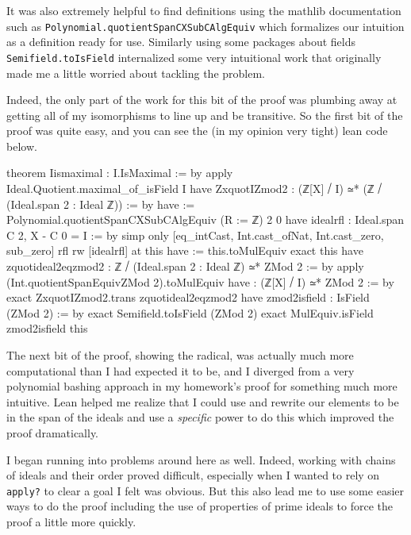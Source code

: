 \documentclass{article}
\begin{document}
\medskip

It was also extremely helpful to find definitions using the mathlib documentation such as \verb|Polynomial.quotientSpanCXSubCAlgEquiv| which formalizes our intuition as a definition ready for use. Similarly using some packages about fields \verb|Semifield.toIsField| internalized some very intuitional work that originally made me a little worried about tackling the problem. 

\medskip

Indeed, the only part of the work for this bit of the proof was plumbing away at getting all of my isomorphisms to line up and be transitive. So the first bit of the proof was quite easy, and you can see the (in my opinion very tight) lean code below. 

\begin{lean}
theorem Iismaximal : I.IsMaximal := by 
  apply Ideal.Quotient.maximal_of_isField I
  have ZxquotIZmod2 : (ℤ[X] ⧸ I) ≃* (ℤ ⧸ (Ideal.span {2} : Ideal ℤ)) := by 
    have := Polynomial.quotientSpanCXSubCAlgEquiv (R := ℤ) 2 0
    have idealrfl : Ideal.span {C 2, X - C 0} = I := by 
      simp only [eq_intCast, Int.cast_ofNat, Int.cast_zero, sub_zero]
      rfl
    rw [idealrfl] at this
    have := this.toMulEquiv 
    exact this
  have zquotideal2eqzmod2 : ℤ ⧸ (Ideal.span {2} : Ideal ℤ) ≃* ZMod 2 := by 
    apply (Int.quotientSpanEquivZMod 2).toMulEquiv 
  have : (ℤ[X] ⧸ I) ≃* ZMod 2 := by 
    exact ZxquotIZmod2.trans zquotideal2eqzmod2
  have zmod2isfield : IsField (ZMod 2) := by 
    exact Semifield.toIsField (ZMod 2)
  exact MulEquiv.isField zmod2isfield this
\end{lean}

The next bit of the proof, showing the radical, was actually much more computational than I had expected it to be, and I diverged from a very polynomial bashing approach in my homework's proof for something much more intuitive. Lean helped me realize that I could use and rewrite our elements to be in the span of the ideals and use a \emph{specific} power to do this which improved the proof dramatically.

\medskip

I began running into problems around here as well. Indeed, working with chains of ideals and their order proved difficult, especially when I wanted to rely on \verb|apply?| to clear a goal I felt was obvious. But this also lead me to use some easier ways to do the proof including the use of properties of prime ideals to force the proof a little more quickly. 
\end{document}
